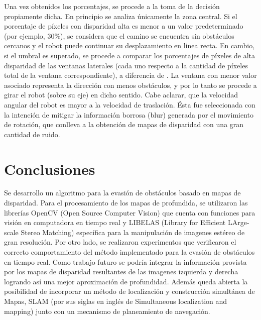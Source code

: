 \documentclass[journal]{IEEEtran}
\begin{document}
Una vez obtenidos los porcentajes, se procede a la toma de la decisi\'on propiamente dicha. En principio se analiza \'unicamente la zona central. Si el porcentaje de p\'ixeles con disparidad alta es menor a un valor predeterminado (por ejemplo, $30\%$), se considera que el camino se encuentra sin obst\'aculos cercanos y el robot puede continuar su desplazamiento en linea recta. En cambio, si el umbral es superado, se procede a comparar los porcentajes de p\'ixeles de alta disparidad de las ventanas laterales (cada uno respecto a la cantidad de p\'ixeles total de la ventana correspondiente), a diferencia de \cite{KNG10}. La ventana con menor valor asociado representa la direcci\'on con menos obst\'aculos, y por lo tanto se procede a girar el robot (sobre su eje) en dicho sentido. Cabe aclarar, que la velocidad angular del robot es mayor a la velocidad de traslaci\'on. \'Esta fue seleccionada con la intenci\'on de mitigar la informaci\'on borrosa (blur) generada por el movimiento de rotaci\'on, que conlleva a la obtenci\'on de mapas de disparidad con una gran cantidad de ruido.


\section{Conclusiones}
\label{sec:conclusiones}
Se desarrollo un algoritmo para la evasi\'on de obst\'aculos basado en mapas de disparidad. Para el procesamiento de los mapas de profundida, se utilizaron las librer\'ias OpenCV (Open Source Computer Vision) que cuenta con funciones para visi\'on en computadora en tiempo real y LIBELAS (Library for Efficient LArge-scale Stereo Matching) espec\'ifica para la manipulaci\'on de imagenes est\'ereo de gran resoluci\'on. Por otro lado, se realizaron experimentos que verificaron el correcto comportamiento del m\'etodo implementado para la evasi\'on de obst\'aculos en tiempo real. Como trabajo futuro se podr\'ia integrar la informaci\'on provista por los mapas de disparidad resultantes de las imagenes izquierda y derecha logrando as\'i una mejor aproximaci\'on de profundidad. Adem\'as queda abierta la posibilidad de incorporar un m\'etodo de localizaci\'on y construcci\'on simult\'anea de Mapas, SLAM (por sus siglas en ingl\'es de Simultaneous localization and mapping) junto con un mecanismo de planeamiento de navegaci\'on.





\nocite{KNG10}
\nocite{G10}
\nocite{opencv}
\nocite{B00}
\nocite{H04}
\nocite{DPSC09}
\nocite{RH04}
\nocite{H09}




%
%

\end{document}
